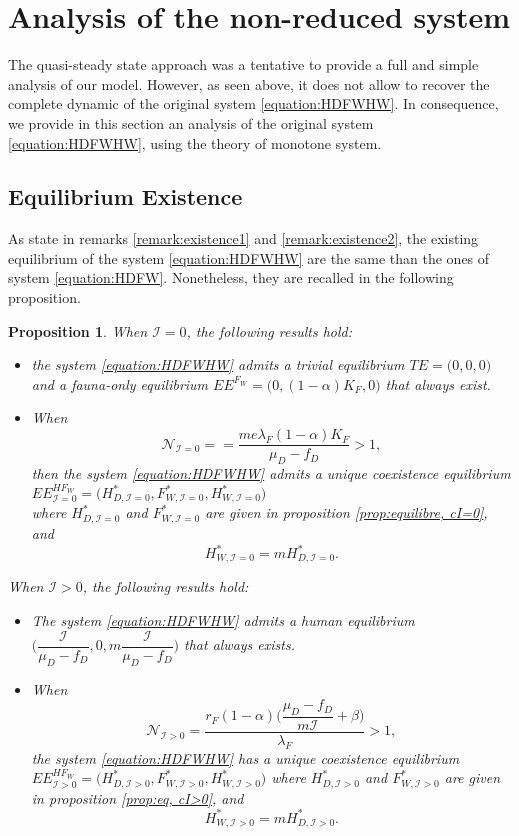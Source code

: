 \documentclass{article}
\newcommand{\lfw}{\lambda_{F}}
\newcommand{\lfw}{\lambda_{F}}
\newcommand{\cI}{\mathcal{I}}
\newtheorem{prop}{Proposition}
\begin{document}
\section{Analysis of the non-reduced system}
The quasi-steady state approach was a tentative to provide a full and simple analysis of our model. However, as seen above, it does not allow to recover the complete dynamic of the original system \eqref{equation:HDFWHW}. In consequence, we provide in this section an analysis of the original system \eqref{equation:HDFWHW}, using the theory of monotone system.

\subsection{Equilibrium Existence}

As state in remarks \ref{remark:existence1} and \ref{remark:existence2}, the existing equilibrium of the system \eqref{equation:HDFWHW} are the same than the ones of system \eqref{equation:HDFW}. Nonetheless, they are recalled in the following proposition.

\begin{prop}
When $\cI = 0$, the following results hold:
\begin{itemize}
\item the system \eqref{equation:HDFWHW} admits a trivial equilibrium $TE = \Big(0,0, 0\Big)$ and a fauna-only equilibrium $EE^{F_W} = \Big(0, (1-\alpha)K_F,0 \Big)$ that always exist.

\item When
$$
\mathcal{N}_{\cI = 0} = = \dfrac{m e \lfw (1-\alpha)K_F}{\mu_D - f_D} > 1,
$$ 
then the system \eqref{equation:HDFWHW} admits a unique coexistence equilibrium $EE^{HF_W}_{\cI = 0} = \Big(H^*_{D, \cI = 0}, F^*_{W, \cI = 0}, H^*_{W, \cI = 0}\Big)$ \\ 
where $H^*_{D, \cI = 0}$ and $F^*_{W, \cI = 0}$ are given in proposition \ref{prop:equilibre, cI=0}, and
$$ 
H^*_{W, \cI = 0} = m H^*_{D, \cI = 0}.
$$
\end{itemize}

When $\cI > 0$, the following results hold:
\begin{itemize}
\item The system \eqref{equation:HDFWHW} admits a human equilibrium $\Big(\dfrac{\cI}{\mu_D - f_D}, 0, m\dfrac{\cI}{\mu_D - f_D} \Big)$ that always exists.
\item When 
$$ \mathcal{N}_{\cI >0} =\dfrac{r_F(1-\alpha)\Big({\dfrac{\mu_D - f_D}{m\cI}+\beta\Big)}}{\lfw}  > 1,$$
the system \eqref{equation:HDFWHW} has a unique coexistence equilibrium $EE^{HF_W}_{\cI > 0} = \Big(H^*_{D, \cI > 0}, F^*_{W, \cI > 0}, H^*_{W, \cI > 0}\Big)$
where $H^*_{D, \cI > 0}$ and $F^*_{W, \cI > 0}$ are given in proposition \ref{prop:eq, cI>0}, and
$$ 
H^*_{W, \cI > 0} = m H^*_{D, \cI > 0}.
$$
\end{itemize} 
\end{prop}  
\end{document}
